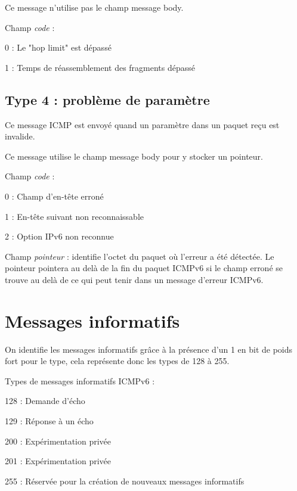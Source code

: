 Ce message n'utilise pas le champ message body.
\medskip

Champ \emph{code} :
    \begin{list}{}{}
    	\item 0 : Le "hop limit" est dépassé
        \item 1 : Temps de réassemblement des fragments dépassé
    \end{list}

\subsection{Type 4 : problème de paramètre}

Ce message ICMP est envoyé quand un paramètre dans un paquet reçu est invalide. 

Ce message utilise le champ message body pour y stocker un pointeur.
\medskip

Champ \emph{code} :           
    \begin{list}{}{}
    	\item 0 : Champ d'en-tête erroné
        \item 1 : En-tête suivant non reconnaissable
        \item 2 : Option IPv6 non reconnue  
    \end{list}

Champ \emph{pointeur} : identifie l'octet du paquet où l'erreur a été détectée. Le pointeur pointera au delà de la fin du paquet ICMPv6 si le champ erroné se trouve au delà de ce qui peut tenir dans un message d'erreur ICMPv6.

\section{Messages informatifs}

	On identifie les messages informatifs grâce à la présence d’un 1 en bit de poids fort pour le type, cela représente donc les types de 128 à 255.
\medskip

Types de messages informatifs ICMPv6 : 
    \begin{list}{}{}
    	\item 128 : Demande d'écho
        \item 129 : Réponse à un écho
        \item 200 : Expérimentation privée  
        \item 201 : Expérimentation privée  
        \item 255 : Réservée pour la création de nouveaux messages informatifs  
    \end{list}
\medskip

